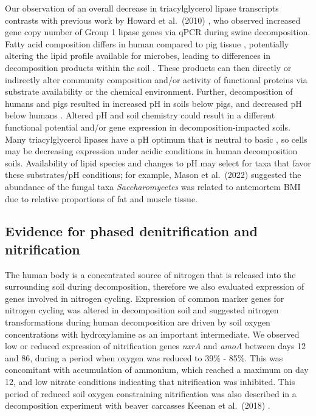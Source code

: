 \documentclass[
  sn-nature,
  lineno, referee]{sn-jnl}
\begin{document}
Our observation of an overall decrease in triacylglycerol lipase
transcripts contrasts with previous work by Howard et al.~(2010)
\citep{howard_characterization_2010}, who observed increased gene copy
number of Group 1 lipase genes via qPCR during swine decomposition.
Fatty acid composition differs in human compared to pig tissue
\citep{notter_initial_2009}, potentially altering the lipid profile
available for microbes, leading to differences in decomposition products
within the soil \citep{debruyn_comparative_2021}. These products can
then directly or indirectly alter community composition and/or activity
of functional proteins via substrate availability or the chemical
environment. Further, decomposition of humans and pigs resulted in
increased pH in soils below pigs, and decreased pH below humans
\citep{debruyn_comparative_2021}. Altered pH and soil chemistry could
result in a different functional potential and/or gene expression in
decomposition-impacted soils. Many triacylglycerol lipases have a pH
optimum that is neutral to basic
\citep{kok_characterization_1995, hasan_influence_2006, zouaoui_production_2012},
so cells may be decreasing expression under acidic conditions in human
decomposition soils. Availability of lipid species and changes to pH may
select for taxa that favor these substrates/pH conditions; for example,
Mason et al.~(2022) \citep{mason_body_2022} suggested the abundance of
the fungal taxa \emph{Saccharomycetes} was related to antemortem BMI due
to relative proportions of fat and muscle tissue.

\subsection{Evidence for phased denitrification and
nitrification}\label{evidence-for-phased-denitrification-and-nitrification}

The human body is a concentrated source of nitrogen that is released
into the surrounding soil during decomposition, therefore we also
evaluated expression of genes involved in nitrogen cycling. Expression
of common marker genes for nitrogen cycling was altered in decomposition
soil and suggested nitrogen transformations during human decomposition
are driven by soil oxygen concentrations with hydroxylamine as an
important intermediate. We observed low or reduced expression of
nitrification genes \emph{nxrA} and \emph{amoA} between days 12 and 86,
during a period when oxygen was reduced to 39\% - 85\%. This was
concomitant with accumulation of ammonium, which reached a maximum on
day 12, and low nitrate conditions indicating that nitrification was
inhibited. This period of reduced soil oxygen constraining nitrification
was also described in a decomposition experiment with beaver carcasses
Keenan et al.~(2018) \citep{keenan_mortality_2018}.
\end{document}
